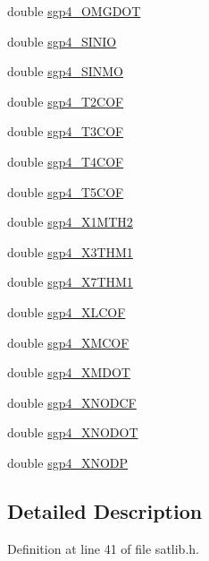 \begin{DoxyCompactItemize}
double \hyperlink{structsgp4__data_aaf1896c52cd17ee52c5c78709b98a063}{sgp4\-\_\-\-O\-M\-G\-D\-O\-T}
\item 
double \hyperlink{structsgp4__data_ad05b71a577cb5e1131329a2c2bae5bd7}{sgp4\-\_\-\-S\-I\-N\-I\-O}
\item 
double \hyperlink{structsgp4__data_ae7c778337c2df4ee1331959013bf6133}{sgp4\-\_\-\-S\-I\-N\-M\-O}
\item 
double \hyperlink{structsgp4__data_a8af827479f36be8131cb3723946559fd}{sgp4\-\_\-\-T2\-C\-O\-F}
\item 
double \hyperlink{structsgp4__data_a19e836b31fd51a6e99ddb36ae3f27eb8}{sgp4\-\_\-\-T3\-C\-O\-F}
\item 
double \hyperlink{structsgp4__data_a8cdd605b7feada1a85d8888a4deed744}{sgp4\-\_\-\-T4\-C\-O\-F}
\item 
double \hyperlink{structsgp4__data_a8139850f778b9001dc8a264e5aaa1fa0}{sgp4\-\_\-\-T5\-C\-O\-F}
\item 
double \hyperlink{structsgp4__data_a904322d83f088e67547a4b1a1a746860}{sgp4\-\_\-\-X1\-M\-T\-H2}
\item 
double \hyperlink{structsgp4__data_aa8f9e6a5b5dc5f2f4f2dde1a7b4e308f}{sgp4\-\_\-\-X3\-T\-H\-M1}
\item 
double \hyperlink{structsgp4__data_af0a4991bd8b347a636712f4bc46cbebc}{sgp4\-\_\-\-X7\-T\-H\-M1}
\item 
double \hyperlink{structsgp4__data_aab16f57889d7d7cd0c1eb3a9edb6972b}{sgp4\-\_\-\-X\-L\-C\-O\-F}
\item 
double \hyperlink{structsgp4__data_acd188cc36233d0d726b79ee167d17742}{sgp4\-\_\-\-X\-M\-C\-O\-F}
\item 
double \hyperlink{structsgp4__data_a229f05e18a9bda018ea8572a2d52eef9}{sgp4\-\_\-\-X\-M\-D\-O\-T}
\item 
double \hyperlink{structsgp4__data_a24e3ca073a4b8974e2b460793e7355df}{sgp4\-\_\-\-X\-N\-O\-D\-C\-F}
\item 
double \hyperlink{structsgp4__data_a1df1672740828f8481b6d7d26b1ebdfe}{sgp4\-\_\-\-X\-N\-O\-D\-O\-T}
\item 
double \hyperlink{structsgp4__data_aeb109a0e09007ac3446353b14f6e7162}{sgp4\-\_\-\-X\-N\-O\-D\-P}
\end{DoxyCompactItemize}


\subsection{Detailed Description}


Definition at line 41 of file satlib.\-h.



